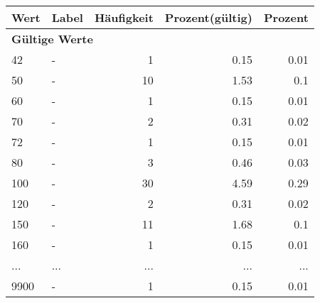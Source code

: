      \begin{longtable}{lXrrr}
     \toprule
     \textbf{Wert} & \textbf{Label} & \textbf{Häufigkeit} & \textbf{Prozent(gültig)} & \textbf{Prozent} \\
     \endhead
     \midrule
     \multicolumn{5}{l}{\textbf{Gültige Werte}}\\
        42 & \multicolumn{1}{X}{-} & %
          \num{1} &
          \num[round-mode=places,round-precision=2]{0,15} &
          \num[round-mode=places,round-precision=2]{0,01} \\
        50 & \multicolumn{1}{X}{-} & %
          \num{10} &
          \num[round-mode=places,round-precision=2]{1,53} &
          \num[round-mode=places,round-precision=2]{0,1} \\
        60 & \multicolumn{1}{X}{-} & %
          \num{1} &
          \num[round-mode=places,round-precision=2]{0,15} &
          \num[round-mode=places,round-precision=2]{0,01} \\
        70 & \multicolumn{1}{X}{-} & %
          \num{2} &
          \num[round-mode=places,round-precision=2]{0,31} &
          \num[round-mode=places,round-precision=2]{0,02} \\
        72 & \multicolumn{1}{X}{-} & %
          \num{1} &
          \num[round-mode=places,round-precision=2]{0,15} &
          \num[round-mode=places,round-precision=2]{0,01} \\
        80 & \multicolumn{1}{X}{-} & %
          \num{3} &
          \num[round-mode=places,round-precision=2]{0,46} &
          \num[round-mode=places,round-precision=2]{0,03} \\
        100 & \multicolumn{1}{X}{-} & %
          \num{30} &
          \num[round-mode=places,round-precision=2]{4,59} &
          \num[round-mode=places,round-precision=2]{0,29} \\
        120 & \multicolumn{1}{X}{-} & %
          \num{2} &
          \num[round-mode=places,round-precision=2]{0,31} &
          \num[round-mode=places,round-precision=2]{0,02} \\
        150 & \multicolumn{1}{X}{-} & %
          \num{11} &
          \num[round-mode=places,round-precision=2]{1,68} &
          \num[round-mode=places,round-precision=2]{0,1} \\
        160 & \multicolumn{1}{X}{-} & %
          \num{1} &
          \num[round-mode=places,round-precision=2]{0,15} &
          \num[round-mode=places,round-precision=2]{0,01} \\
       ... & ... & ... & ... & ... \\
        9900 & \multicolumn{1}{X}{-} & %
          \num{1} &
          \num[round-mode=places,round-precision=2]{0,15} &
          \num[round-mode=places,round-precision=2]{0,01} \\


\end{longtable}
